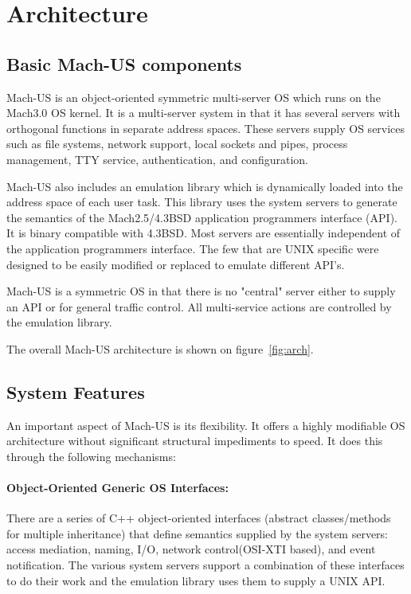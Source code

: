 \section{Architecture}

\subsection{Basic Mach-US components}
Mach-US is an object-oriented symmetric multi-server OS
which runs on the Mach3.0 OS kernel.
It is a multi-server system in that it has several
servers with orthogonal functions in separate address spaces.
These servers supply OS services such
as file systems, network support, local sockets and pipes,
process management, TTY service, authentication, and configuration.

Mach-US also includes an emulation library
which is dynamically loaded into the address space of each user task.
This library uses the system servers
to generate the semantics of the Mach2.5/4.3BSD application programmers
interface (API).  It is binary compatible with 4.3BSD.
Most servers are essentially independent of the application programmers
interface.
The few that are UNIX specific were designed to
be easily modified or replaced to emulate different API's.

Mach-US is a symmetric OS in that there is no "central" server
either to supply an API or for general traffic control.
All multi-service actions are controlled by the emulation library.

The overall Mach-US architecture is shown on figure~\ref{fig:arch}.

\subsection{System Features}
An important aspect of Mach-US is its flexibility.  It offers a
highly modifiable OS architecture without significant
structural impediments to speed.  It does this through the following
mechanisms:

\paragraph{Object-Oriented Generic OS Interfaces:}
There are a series of C++ object-oriented
interfaces (abstract classes/methods for multiple inheritance)
that define semantics supplied by the
system servers: access mediation, naming, I/O, 
network control(OSI-XTI based), and event notification.
The various system servers support a
combination of these interfaces to do their work and the emulation library
uses them to supply a UNIX API.

